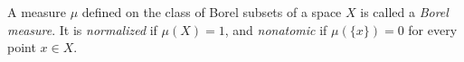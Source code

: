 A measure $\mu$ defined on the class of Borel subsets of a space $X$ is called a \textit{Borel measure}. It is \textit{normalized} if $\mu(X) = 1$, and \textit{nonatomic} if $\mu(\{x\}) = 0$ for every point $x \in X$.
